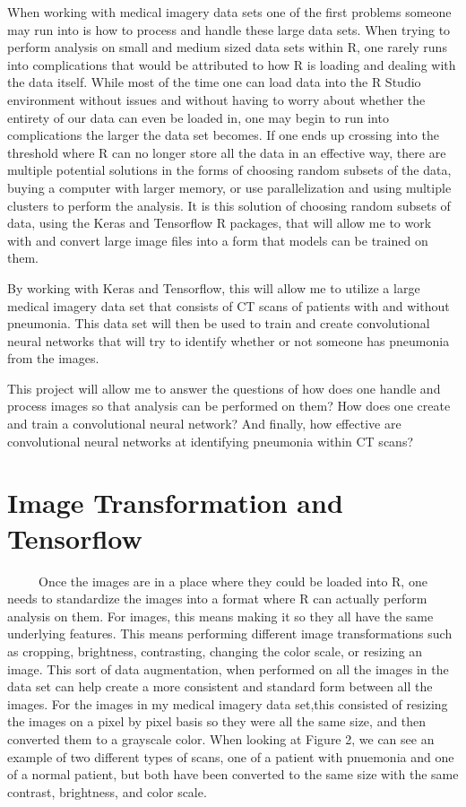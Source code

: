 \documentclass[12pt]{article}
\begin{document}
When working with medical imagery data sets one of the first problems
someone may run into is how to process and handle these large data sets.
When trying to perform analysis on small and medium sized data sets
within R, one rarely runs into complications that would be attributed to
how R is loading and dealing with the data itself. While most of the
time one can load data into the R Studio environment without issues and
without having to worry about whether the entirety of our data can even
be loaded in, one may begin to run into complications the larger the
data set becomes. If one ends up crossing into the threshold where R can
no longer store all the data in an effective way, there are multiple
potential solutions in the forms of choosing random subsets of the data,
buying a computer with larger memory, or use parallelization and using
multiple clusters to perform the analysis. It is this solution of
choosing random subsets of data, using the Keras and Tensorflow R
packages, that will allow me to work with and convert large image files
into a form that models can be trained on them.

By working with Keras and Tensorflow, this will allow me to utilize a
large medical imagery data set that consists of CT scans of patients
with and without pneumonia. This data set will then be used to train and
create convolutional neural networks that will try to identify whether
or not someone has pneumonia from the images.

This project will allow me to answer the questions of how does one
handle and process images so that analysis can be performed on them? How
does one create and train a convolutional neural network? And finally,
how effective are convolutional neural networks at identifying pneumonia
within CT scans?

\hypertarget{image-transformation-and-tensorflow}{%
\section{Image Transformation and
Tensorflow}\label{image-transformation-and-tensorflow}}

~~~~~Once the images are in a place where they could be loaded into R,
one needs to standardize the images into a format where R can actually
perform analysis on them. For images, this means making it so they all
have the same underlying features. This means performing different image
transformations such as cropping, brightness, contrasting, changing the
color scale, or resizing an image. This sort of data augmentation, when
performed on all the images in the data set can help create a more
consistent and standard form between all the images. For the images in
my medical imagery data set,this consisted of resizing the images on a
pixel by pixel basis so they were all the same size, and then converted
them to a grayscale color. When looking at Figure 2, we can see an
example of two different types of scans, one of a patient with pnuemonia
and one of a normal patient, but both have been converted to the same
size with the same contrast, brightness, and color scale.
\end{document}
